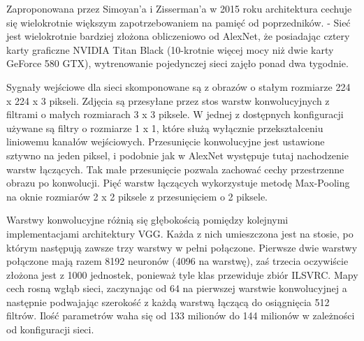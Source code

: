 \documentclass[12pt,a4paper,twoside,titlepage,openright]{book}
\begin{document}
\begin{itemize}
Zaproponowana przez Simoyan'a i Zisserman'a w 2015 roku architektura cechuje się wielokrotnie większym zapotrzebowaniem na pamięć od poprzedników. - %
Sieć jest wielokrotnie bardziej złożona obliczeniowo od AlexNet, że posiadając cztery karty graficzne NVIDIA Titan Black (10-krotnie więcej mocy niż dwie karty GeForce 580 GTX), wytrenowanie pojedynczej sieci zajęło ponad dwa tygodnie.

Sygnały wejściowe dla sieci skomponowane są z obrazów o stałym rozmiarze 224 x 224 x 3 pikseli. Zdjęcia są przesyłane przez stos warstw konwolucyjnych z filtrami o małych rozmiarach 3 x 3 piksele. W jednej z dostępnych konfiguracji używane są filtry o rozmiarze 1 x 1, które służą wyłącznie przekształceniu liniowemu kanałów wejściowych. Przesunięcie konwolucyjne jest ustawione sztywno na jeden piksel, i podobnie jak w AlexNet występuje tutaj nachodzenie warstw łączących. Tak małe przesunięcie pozwala zachować cechy przestrzenne obrazu po konwolucji. Pięć warstw łączących wykorzystuje metodę Max-Pooling na oknie rozmiarów 2 x 2 piksele z przesunięciem o 2 piksele.

Warstwy konwolucyjne różnią się głębokością pomiędzy kolejnymi implementacjami architektury VGG. Każda z nich umieszczona jest na stosie, po którym następują zawsze trzy warstwy w pełni połączone. Pierwsze dwie warstwy połączone mają razem 8192 neuronów (4096 na warstwę), zaś trzecia oczywiście złożona jest z 1000 jednostek, ponieważ tyle klas przewiduje zbiór ILSVRC. Mapy cech rosną wgłąb sieci, zaczynając od 64 na pierwszej warstwie konwolucyjnej a następnie podwajając szerokość z każdą warstwą łączącą do osiągnięcia 512 filtrów. Ilość parametrów waha się od 133 milionów do 144 milionów w zależności od konfiguracji sieci.


\end{itemize}
\end{document}
